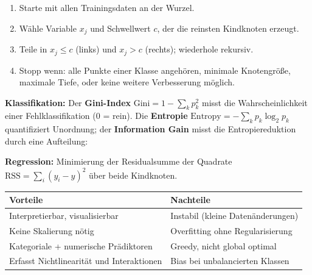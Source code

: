 \begin{enumerate}[leftmargin=2em]
    \item Starte mit allen Trainingsdaten an der Wurzel.
    \item Wähle Variable $x_j$ und Schwellwert $c$, der die reinsten Kindknoten erzeugt.
    \item Teile in $x_j \leq c$ (links) und $x_j > c$ (rechts); wiederhole rekursiv.
    \item Stopp wenn: alle Punkte einer Klasse angehören, minimale Knotengröße, maximale Tiefe, oder keine weitere Verbesserung möglich.
\end{enumerate}


\textbf{Klassifikation:} Der \textbf{Gini-Index} $\text{Gini} = 1 - \sum_{k} p_k^2$ misst die Wahrscheinlichkeit einer Fehlklassifikation (0 = rein). Die \textbf{Entropie} $\text{Entropy} = -\sum_{k} p_k \log_2 p_k$ quantifiziert Unordnung; der \textbf{Information Gain} misst die Entropiereduktion durch eine Aufteilung:

\textbf{Regression:} Minimierung der Residualsumme der Quadrate $\text{RSS} = \sum_i (y_i - \hat{y})^2$ über beide Kindknoten.


\begin{table}[h]
    \centering\small
    \begin{tabular}{ll}
        \toprule
        \textbf{Vorteile} & \textbf{Nachteile} \\
        \midrule
        Interpretierbar, visualisierbar & Instabil (kleine Datenänderungen) \\
        Keine Skalierung nötig & Overfitting ohne Regularisierung \\
        Kategoriale + numerische Prädiktoren & Greedy, nicht global optimal \\
        Erfasst Nichtlinearität und Interaktionen & Bias bei unbalancierten Klassen \\
        \bottomrule
    \end{tabular}
\end{table}

